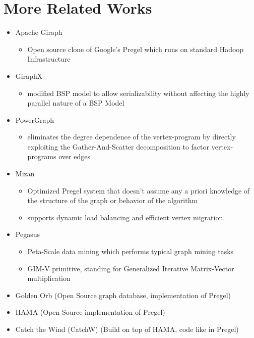 \section{More Related Works}
\begin{frame}
\begin{itemize}

  \item Apache Giraph 
    \begin{itemize}
        \item Open source clone of Google's Pregel which runs on standard Hadoop Infrastructure 
    \end{itemize}
    
  \item GiraphX 
     \begin{itemize}
        \item modified BSP model to allow serializability without affecting the highly parallel nature of a BSP Model
     \end{itemize} 
     
     \item PowerGraph 
     \begin{itemize}
    	\item eliminates the degree dependence of the vertex-program by directly exploiting the Gather-And-Scatter decomposition to factor vertex-programs over edges
     \end{itemize} 
     
  \item Mizan 
  	\begin{itemize}
        \item Optimized Pregel system  that doesn't assume any a priori knowledge of the structure of the graph or behavior of the algorithm
        \item supports  dynamic  load  balancing  and  efficient vertex migration.
     \end{itemize} 
    \end{itemize}
\end{frame}
  
  \begin{frame}
\begin{itemize}
  
  \item Pegasus
  	\begin{itemize}
	\item Peta-Scale data mining which performs typical graph mining tasks 
  	\item GIM-V primitive,  standing  for Generalized  Iterative  Matrix-Vector  multiplication
	\end{itemize}
	
  \item Golden Orb (Open Source graph database, implementation of Pregel)
  
  \item HAMA (Open Source implementation of Pregel) 
  \item Catch the Wind (CatchW) (Build on top of HAMA, code like in Pregel) 
  
  \end{itemize}
\end{frame}